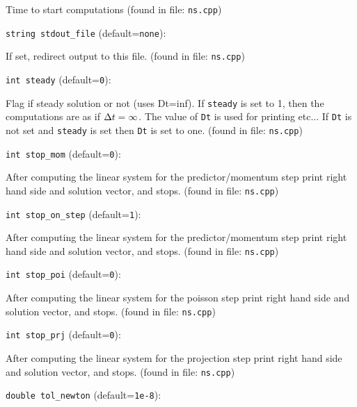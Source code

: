Time to start computations
 (found in file: \verb+ns.cpp+)
\item\verb+string stdout_file+ {\rm(default=\verb|none|)}:

If set, redirect output to this file.
 (found in file: \verb+ns.cpp+)
\item\verb+int steady+ {\rm(default=\verb|0|)}:

Flag if steady solution or not (uses Dt=inf). If  \verb+steady+ 
is set to 1, then the computations are as if ${\Delta t}=\infty$. 
The value of  \verb+Dt+  is used for printing etc... If  \verb+Dt+ 
is not set and  \verb+steady+  is set then  \verb+Dt+  is set to one.
 (found in file: \verb+ns.cpp+)
\item\verb+int stop_mom+ {\rm(default=\verb|0|)}:

After computing the linear system for the
 predictor/momentum step print right hand side
 and solution vector, and stops.
 (found in file: \verb+ns.cpp+)
\item\verb+int stop_on_step+ {\rm(default=\verb|1|)}:

After computing the linear system for the
 predictor/momentum step print right hand side
 and solution vector, and stops.
 (found in file: \verb+ns.cpp+)
\item\verb+int stop_poi+ {\rm(default=\verb|0|)}:

After computing the linear system for the poisson step print
right hand side and solution vector, and stops. 
 (found in file: \verb+ns.cpp+)
\item\verb+int stop_prj+ {\rm(default=\verb|0|)}:

After computing the linear system for the projection step print
right hand side and solution vector, and stops. 
 (found in file: \verb+ns.cpp+)
\item\verb+double tol_newton+ {\rm(default=\verb|1e-8|)}:

